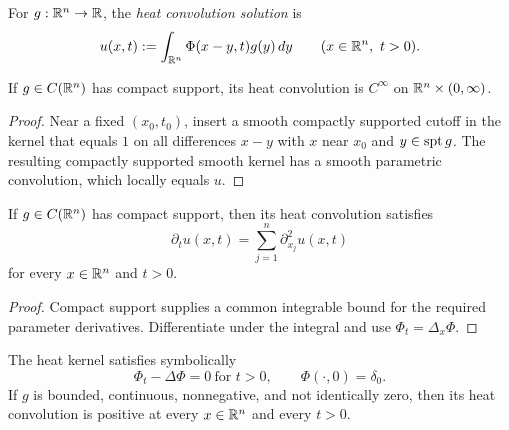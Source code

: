 \begin{definition}
\label{def:heat-convolution-solution}





For $g:\mathbb{R}^n\to\mathbb{R}$, the \emph{heat convolution solution} is
$$u(x,t):=\int_{\mathbb{R}^n}\Phi(x-y,t)g(y)\,dy
\qquad(x\in\mathbb{R}^n,\ t>0).$$
\end{definition}

\begin{lemma}
\label{lem:heat-convolution-smooth}





If $g\in C(\mathbb{R}^n)$ has compact support, its heat convolution is
$C^\infty$ on $\mathbb{R}^n\times(0,\infty)$.
\end{lemma}
\begin{proof}

\sketch Near a fixed $(x_0,t_0)$, insert a smooth compactly supported cutoff
in the kernel that equals $1$ on all differences $x-y$ with $x$ near $x_0$
and $y\in\operatorname{spt} g$. The resulting compactly supported smooth kernel has a smooth
parametric convolution, which locally equals $u$.
\end{proof}

\begin{lemma}
\label{lem:heat-convolution-solves-heat}





If $g\in C(\mathbb{R}^n)$ has compact support, then its heat convolution satisfies
$$\partial_tu(x,t)=\sum_{j=1}^n\partial_{x_j}^2u(x,t)$$
for every $x\in\mathbb{R}^n$ and $t>0$.
\end{lemma}
\begin{proof}

\sketch Compact support supplies a common integrable bound for the required
parameter derivatives. Differentiate under the integral and use
$\Phi_t=\Delta_x\Phi$.
\end{proof}

\begin{remark}
\label{rem:heat-equation-infinite-propagation-speed}

The heat kernel satisfies symbolically
$$\Phi_t-\Delta\Phi=0\ \text{for }t>0,
\qquad
\Phi(\cdot,0)=\delta_0.$$
If $g$ is bounded, continuous, nonnegative, and not identically zero, then its
heat convolution is positive at every $x\in\mathbb{R}^n$ and every $t>0$.
\end{remark}

